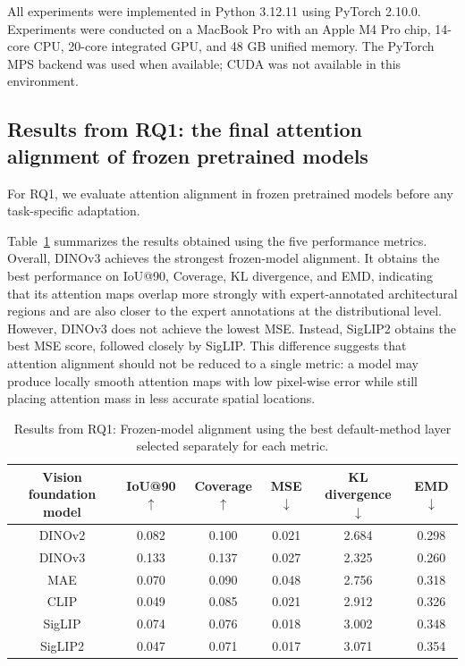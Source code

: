 \documentclass[lineno,pdflatex,sn-mathphys-num]{sn-jnl}%
\theoremstyle{thmstyleone}%
\theoremstyle{thmstyletwo}%
\theoremstyle{thmstylethree}%
\begin{document}
All experiments were implemented in Python 3.12.11 using PyTorch 2.10.0. Experiments were conducted on a MacBook Pro with an Apple M4 Pro chip, 14-core CPU, 20-core integrated GPU, and 48 GB unified memory. The PyTorch MPS backend was used when available; CUDA was not available in this environment.

\subsection{Results from RQ1: the final attention alignment of frozen pretrained models}

For RQ1, we evaluate attention alignment in frozen pretrained models before any task-specific adaptation.

Table~\ref{table RQ1 result} summarizes the results obtained using the five performance metrics. Overall, DINOv3 achieves the strongest frozen-model alignment. It obtains the best performance on IoU@90, Coverage, KL divergence, and EMD, indicating that its attention maps overlap more strongly with expert-annotated architectural regions and are also closer to the expert annotations at the distributional level. However, DINOv3 does not achieve the lowest MSE. Instead, SigLIP2 obtains the best MSE score, followed closely by SigLIP. This difference suggests that attention alignment should not be reduced to a single metric: a model may produce locally smooth attention maps with low pixel-wise error while still placing attention mass in less accurate spatial locations.

\begin{table}[!h]
\centering
\caption{Results from RQ1: Frozen-model alignment using the best default-method layer selected separately for each metric.\label{table RQ1 result}}
\begin{tabular}{cccccc}
\toprule
Vision foundation model & IoU@90 $\uparrow$ & Coverage $\uparrow$ & MSE $\downarrow$ & KL divergence $\downarrow$ & EMD $\downarrow$ \\ \midrule
DINOv2    & 0.082 & 0.100 & 0.021 & 2.684 & 0.298 \\
DINOv3     & 0.133 & 0.137 & 0.027 & 2.325 & 0.260 \\
MAE        & 0.070 & 0.090 & 0.048 & 2.756 & 0.318 \\
CLIP      & 0.049 & 0.085 & 0.021 & 2.912 & 0.326 \\
SigLIP    & 0.074 & 0.076 & 0.018 & 3.002 & 0.348 \\
SigLIP2   & 0.047 & 0.071 & 0.017 & 3.071 & 0.354 \\ \bottomrule
\end{tabular}
\end{table}
\end{document}
